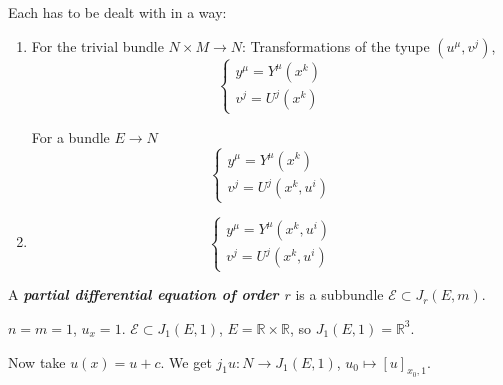 Each has to be dealt with in a way:
\begin{enumerate}
\item For the trivial bundle $N\times M \to
N$: Transformations of the tyupe
$(u^\mu,v^j)$,
$$
\begin{cases}
y^\mu=Y^\mu(x^k) \\
v^j=U^j(x^k)
\end{cases}
$$

For a bundle $E \to N$
$$
\begin{cases}
y^\mu=Y^\mu(x^k) \\
v^j=U^j(x^k, u^i)
\end{cases}
$$

\item
$$
\begin{cases}
y^\mu=Y^\mu(x^k,u^i) \\
v^j=U^j(x^k,u^i)
\end{cases}
$$
\end{enumerate}

\begin{definition}
\label{definition-wdvv-pde}
A {\it\bf partial differential equation of
order $r$} is a subbundle $\mathcal{E}\subset
J_r(E,m)$.
\end{definition}

\begin{example}
\label{example-wdvv-ux}
$n=m=1$, $u_x=1$. $\mathcal{E}\subset
J_1(E,1)$, $E= \mathbb{R} \times \mathbb{R}$,
so $J_1(E,1)=\mathbb{R}^3$.

Now take $u(x)=u+c$. We get  $j_1u:N \to
J_1(E,1)$, $ u_0 \mapsto [u]_{x_0,1}$.
\end{example}

